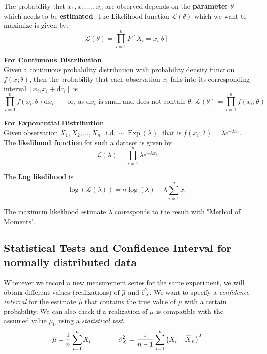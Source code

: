 \documentclass[11pt]{article}
\newcommand*\Likelihood{\mathcal{L}}
\newcommand*\Exp[1]{\mathop{\text{Exp}}\left(#1\right)}
\newcommand{\overbar}[1]{\mkern 1.5mu\overline{\mkern-1.5mu#1\mkern-1.5mu}\mkern 1.5mu}
\begin{document}
The probability that $x_1,x_2,\dots,x_n$ are observed depends on the \textbf{parameter $\theta$} which needs to be \textbf{estimated}. The Likelihood function $\Likelihood(\theta)$ which we want to maximize is given by:
\begin{equation*}
	\Likelihood(\theta) = \prod_{i=1}^{n} P[X_i = x_i | \theta ]
\end{equation*}

\begin{definition}
	\textbf{For Continuous Distribution}\\
	Given a continuous probability distribution  with probability density function $f (x;\theta)$, then the probability that each observation $x_i$ falls into its corresponding interval $[x_i, x_i + \text{d}x_i]$ is
	\begin{equation*}
		\prod_{i=1}^{n} f(x_i; \theta) \text{d}x_i \quad \quad \text{or, as d} x_i \text{ is small and does not contain }\theta \text{: } \Likelihood(\theta) = \prod_{i=1}^{n} f(x_i;\theta)
	\end{equation*}
\end{definition}

\begin{definition}
	\textbf{For Exponential Distribution}\\
	Given observation $X_1, X_2, \dots, X_n\ \text{i.i.d.}\ \sim \Exp{\lambda}$, that is $f(x_i;\lambda) = \lambda e^{-\lambda x_i}$. The \textbf{likelihood function} for such a dataset is given by
	\begin{equation*}
		\Likelihood(\lambda) = \prod_{i=1}^{n} \lambda e^{-\lambda x_i}
	\end{equation*}
	
	\noindent
	The \textbf{Log likelihood} is
	\begin{equation*}
		\log(\Likelihood(\lambda)) = n\log(\lambda) - \lambda\sum_{i=1}^n x_i
	\end{equation*}
	
	\noindent
	The maximum likelihood estimate $\hat{\lambda}$ corresponds to the result with "Method of Moments".
\end{definition}

\subsection{Statistical Tests and Confidence Interval for normally distributed data}
Whenever we record a new measurement series for the same experiment, we will obtain different values (realizations) of $\hat{\mu}$ and $\hat{\sigma}^2_X$. We want to specify a \textit{confidence interval} for the estimate $\hat{\mu}$ that contains the true value of $\mu$ with a certain probability. We can also check if a realization of $\mu$ is compatible with the assumed value $\mu_0$ using a \textit{statistical test}.
\begin{equation*}
	\hat{\mu} = \frac{1}{n} \sum_{i=1}^{n}X_i \qquad \qquad
	\hat{\sigma}^2_X = \frac{1}{n-1} \sum_{i=1}^{n}\left(X_i-\overbar{X}_n\right)^2
\end{equation*}
\end{document}
